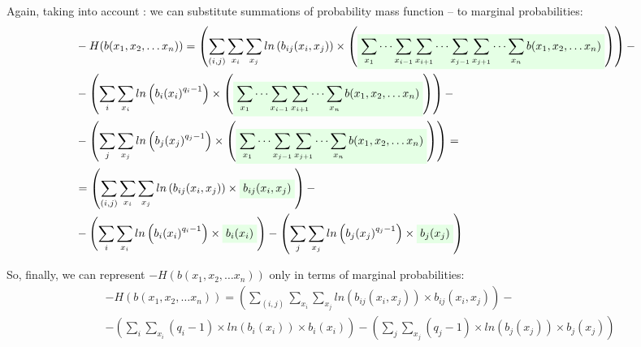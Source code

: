 \documentclass[fleqn,leqno]{article}
\newcommand{\highlight}[1]{\colorbox{green!10}{$\displaystyle#1$}}
\begin{document}
Again, taking into account : we can substitute summations of probability mass function -- to marginal probabilities:
\begin{equation}
\begin{split}
  & -H(b(x_1,x_2,\dots x_n)) = \left( \sum_{(i, j)} \sum_{x_i} \sum_{x_j} ln \left( b_{ij}(x_i, x_j) \right) \times \left( \highlight{ \sum_{x_1} \cdots \sum_{x_{i-1}} \sum_{x_{i+1}} \cdots \sum_{x_{j-1}} \sum_{x_{j+1}} \cdots \sum_{x_n} b(x_1, x_2, \dots x_n) } \right) \right) - \\
  & -\left( \sum_i \sum_{x_i} ln \left({b_i(x_i)}^{q_i - 1}\right) \times \left( \highlight{ \sum_{x_1} \cdots \sum_{x_{i - 1}} \sum_{x_{i + 1}} \cdots \sum_{x_n} b(x_1, x_2, \dots x_n) } \right) \right) - \\
  & -\left( \sum_j \sum_{x_j} ln \left({b_j(x_j)}^{q_j - 1}\right) \times \left( \highlight{ \sum_{x_1} \cdots \sum_{x_{j - 1}} \sum_{x_{j + 1}} \cdots \sum_{x_n} b(x_1, x_2, \dots x_n) } \right) \right) = \\
  & = \left( \sum_{(i, j)} \sum_{x_i} \sum_{x_j} ln \left( b_{ij}(x_i, x_j) \right) \times \highlight{ b_{ij}(x_i, x_j) } \right) - \\
  & -\left( \sum_i \sum_{x_i} ln \left({b_i(x_i)}^{q_i - 1}\right) \times \highlight{ b_i(x_i) } \right) - \left( \sum_j \sum_{x_j} ln \left({b_j(x_j)}^{q_j - 1}\right) \times \highlight{ b_j(x_j) } \right)
\end{split}
\end{equation}

So, finally, we can represent $-H(b(x_1,x_2,\dots x_n))$ only in terms of marginal probabilities:
\begin{equation} \label{eq:H_in_terms_of_local_marginals}
\begin{split}
  & -H(b(x_1,x_2,\dots x_n)) = \left( \sum_{(i, j)} \sum_{x_i} \sum_{x_j} ln \left( b_{ij}(x_i, x_j) \right) \times b_{ij}(x_i, x_j) \right) - \\
  & -\left( \sum_i \sum_{x_i} (q_i - 1) \times ln(b_i(x_i)) \times b_i(x_i) \right) - \left( \sum_j \sum_{x_j} (q_j - 1) \times ln(b_j(x_j)) \times b_j(x_j) \right)
\end{split}
\end{equation}
\end{document}

